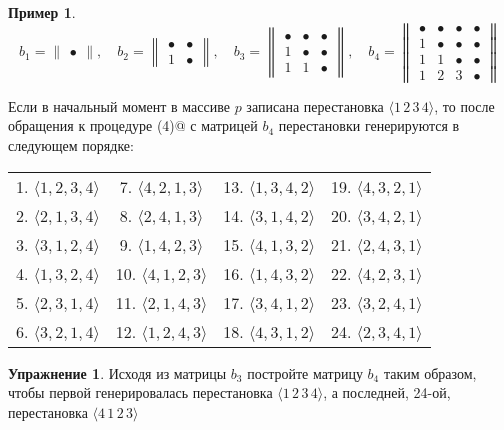\documentclass[12pt,a4paper]{article}
\theoremstyle{plain}
\theoremstyle{definition}
\newtheorem*{task}{Упражнение}
\newtheorem*{example}{Пример}
\theoremstyle{remark}
\begin{document}
\begin{example}
\[ b_1 = \begin{Vmatrix} \bullet \end{Vmatrix},\quad
b_2 = \begin{Vmatrix} \bullet & \bullet \\ 1 & \bullet \end{Vmatrix},\quad
b_3 = \begin{Vmatrix} \bullet & \bullet & \bullet \\ 1 & \bullet & \bullet \\ 1 & 1 & \bullet \end{Vmatrix},\quad
b_4 = \begin{Vmatrix} \bullet & \bullet & \bullet & \bullet \\ 1 & \bullet & \bullet & \bullet \\ 1 & 1 & \bullet & \bullet \\ 1 & 2 & 3 & \bullet \end{Vmatrix}
\]

Если в начальный момент в массиве $p$ записана перестановка $\langle 1\,2\,3\,4\rangle$, то после обращения к процедуре \verb@PERM(4)@ с матрицей $b_4$ перестановки генерируются в следующем порядке:

\begin{tabular}{cccc}
1. $\langle1,2,3,4\rangle$ & 7. $\langle4,2,1,3\rangle$ & 13. $\langle1,3,4,2\rangle$ & 19. $\langle4,3,2,1\rangle$ \\
2. $\langle2,1,3,4\rangle$ & 8. $\langle2,4,1,3\rangle$ & 14. $\langle3,1,4,2\rangle$ & 20. $\langle3,4,2,1\rangle$ \\
3. $\langle3,1,2,4\rangle$ & 9. $\langle1,4,2,3\rangle$ & 15. $\langle4,1,3,2\rangle$ & 21. $\langle2,4,3,1\rangle$ \\
4. $\langle1,3,2,4\rangle$ & 10. $\langle4,1,2,3\rangle$ & 16. $\langle1,4,3,2\rangle$ & 22. $\langle4,2,3,1\rangle$ \\
5. $\langle2,3,1,4\rangle$ & 11. $\langle2,1,4,3\rangle$ & 17. $\langle3,4,1,2\rangle$ & 23. $\langle3,2,4,1\rangle$ \\
6. $\langle3,2,1,4\rangle$ & 12. $\langle1,2,4,3\rangle$ & 18. $\langle4,3,1,2\rangle$ & 24. $\langle2,3,4,1\rangle$
\end{tabular}
\end{example}

\begin{task}
Исходя из матрицы $b_3$ постройте матрицу $b_4$ таким образом, чтобы первой генерировалась перестановка $\langle 1\,2\,3\,4 \rangle$, а последней, 24-ой, перестановка $\langle 4\,1\,2\,3\rangle$
\end{task}
\end{document}
